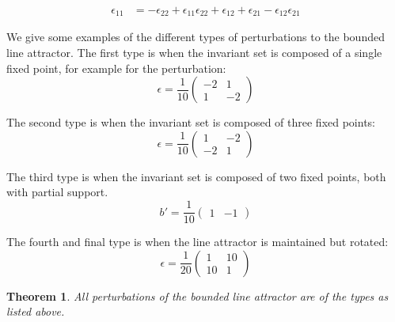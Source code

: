 \documentclass{article} %
\newcounter{ct}
\newtheorem{theorem}{Theorem}
\theoremstyle{definition}
\theoremstyle{remark}
\begin{document}
\begin{align}
\epsilon_{11} &= -\epsilon_{22}+\epsilon_{11}\epsilon_{22} + \epsilon_{12} + \epsilon_{21} - \epsilon_{12}\epsilon_{21}
\end{align}



We give some examples of the different types of perturbations to the bounded line attractor.
The first type is when the invariant set is composed of a single fixed point, for example for the perturbation:
\begin{equation}
\epsilon = \frac{1}{10}
\begin{pmatrix}
-2  &  1 \\
 1   &  -2
\end{pmatrix}
\end{equation}



The second type is when the invariant set is composed of three fixed points:
\begin{equation}
\epsilon = \frac{1}{10}
\begin{pmatrix}
1  &  -2 \\
 -2  &  1
\end{pmatrix}
\end{equation}

The third type is when the invariant set is composed of two fixed points, both with partial support.
\begin{equation}
b' =  \frac{1}{10}
\begin{pmatrix}
1 & -1
\end{pmatrix}
\end{equation}

The fourth and final type is when the line attractor is maintained but rotated:
\begin{equation}
\epsilon =  \frac{1}{20}
\begin{pmatrix}
1 & 10\\
10 & 1
\end{pmatrix}
\end{equation}

\begin{theorem}
All perturbations of the bounded line attractor are of the types as listed above.
\end{theorem}
\end{document}
